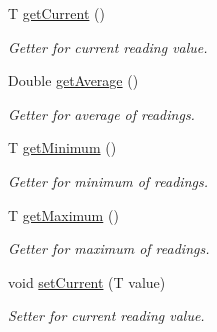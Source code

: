 \begin{DoxyCompactItemize}
T \hyperlink{class_android_app_1_1_data_item_aee0b56933fb8673f7b6e52cde9da157c}{get\+Current} ()
\begin{DoxyCompactList}\small\item\em Getter for current reading value. \end{DoxyCompactList}\item 
Double \hyperlink{class_android_app_1_1_data_item_ad3b598a42bc7e38aa46d5091a752a47b}{get\+Average} ()
\begin{DoxyCompactList}\small\item\em Getter for average of readings. \end{DoxyCompactList}\item 
T \hyperlink{class_android_app_1_1_data_item_a1acf18ed04f82adb18ff73f4ef70b863}{get\+Minimum} ()
\begin{DoxyCompactList}\small\item\em Getter for minimum of readings. \end{DoxyCompactList}\item 
T \hyperlink{class_android_app_1_1_data_item_abc05cb2c7e1c30a018191cb140afc948}{get\+Maximum} ()
\begin{DoxyCompactList}\small\item\em Getter for maximum of readings. \end{DoxyCompactList}\item 
void \hyperlink{class_android_app_1_1_data_item_a6cd8975067d5be2d5eaac137a94c0eac}{set\+Current} (T value)
\begin{DoxyCompactList}\small\item\em Setter for current reading value. \end{DoxyCompactList}\end{DoxyCompactItemize}
